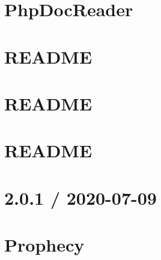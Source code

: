 \documentclass[twoside]{book}
\newcommand{\+}{\discretionary{\mbox{\scriptsize$\hookleftarrow$}}{}{}}
\begin{document}
\chapter{Php\+Doc\+Reader}
\label{md__c__workspace__proyecto__p_h_p_project_vendor_php_di_phpdoc_reader__r_e_a_d_m_e}

\chapter{README}
\label{md__c__workspace__proyecto__p_h_p_project_vendor_phpdocumentor_reflection_common__r_e_a_d_m_e}

\chapter{README}
\label{md__c__workspace__proyecto__p_h_p_project_vendor_phpdocumentor_reflection_docblock__r_e_a_d_m_e}

\chapter{README}
\label{md__c__workspace__proyecto__p_h_p_project_vendor_phpdocumentor_type_resolver__r_e_a_d_m_e}

\chapter{2.0.1 / 2020-\/07-\/09}
\label{md__c__workspace__proyecto__p_h_p_project_vendor_phpspec_prophecy_phpunit__c_h_a_n_g_e_s}

\chapter{Prophecy}
\label{md__c__workspace__proyecto__p_h_p_project_vendor_phpspec_prophecy_phpunit__r_e_a_d_m_e}

\end{document}
